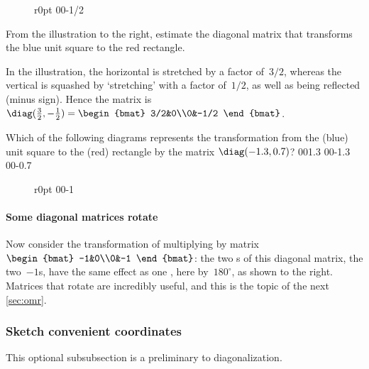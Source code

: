 \begin{wrapfigure}r{0pt} 00{-1/2} \end{wrapfigure}
\begin{example} 
From the illustration to the right, estimate the diagonal matrix that transforms the blue unit square to the red rectangle. 

\begin{solution} 
In the illustration, the horizontal is stretched by a factor of~\(3/2\), whereas the vertical is squashed by `stretching' with a factor of~\(1/2\), as well as being reflected (minus sign). 
Hence the matrix is
\(\diag(\frac32,-\frac12)=\begin{bmat} 3/2&0\\0&-1/2 \end{bmat}\).
\aqed

\end{solution}
\end{example}



\begin{activity}
Which of the following diagrams represents the transformation from the (blue) unit square to the (red) rectangle by the matrix \(\diag(-1.3,0.7)\)?
{00{1.3}}
{00{-1.3}}
{00{-0.7}}
\end{activity}




\begin{wrapfigure}r{0pt} 00{-1} \end{wrapfigure}
\paragraph{Some diagonal matrices rotate}
Now consider the transformation of multiplying by matrix \(\begin{bmat} -1&0\\0&-1 \end{bmat}\):
the two s of this diagonal matrix, the two~\(-1\)s, have  the same effect as one , here by~\(180^\circ\), as shown to the right.
Matrices that rotate are incredibly useful, and this is the topic of the next \cref{sec:omr}.






\subsubsection{Sketch convenient coordinates}
This optional subsubsection is a preliminary to diagonalization.

